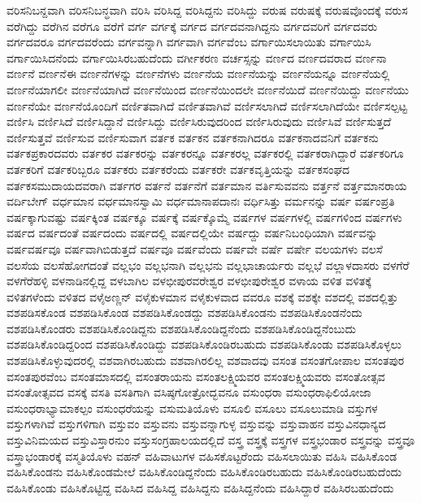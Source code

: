 {ವರಿಸನಿಬನ್ದವಾಗಿ
ವರಿಸನಿಬನ್ಧವಾಗಿ
ವರಿಸಿ
ವರಿಸಿದ್ದ
ವರಿಸಿದ್ದನು
ವರಿಸಿದ್ದು
ವರುಷ
ವರುಷಕ್ಕೆ
ವರುಷವೊಂದಕ್ಕೆ
ವರುಸ
ವರೆಗಿದ್ದು
ವರೆಗಿನ
ವರೆಗೂ
ವರೆಗೆ
ವರ್ಗ
ವರ್ಗಕ್ಕೆ
ವರ್ಗದ
ವರ್ಗದವನಾಗಿದ್ದನು
ವರ್ಗದವರಿಗೆ
ವರ್ಗದವರು
ವರ್ಗದವರೂ
ವರ್ಗದವರೆಂದು
ವರ್ಗವನ್ನಾಗಿ
ವರ್ಗವಾಗಿ
ವರ್ಗವೆಂಬ
ವರ್ಗಾಯಿಸಲಾಯಿತು
ವರ್ಗಾಯಿಸಿ
ವರ್ಗಾಯಿಸಿದನೆಂದು
ವರ್ಗಾಯಿಸಿರಬಹುದೆಂದು
ವರ್ಗೀಕರಣ
ವರ್ಚಸ್ಸನ್ನು
ವರ್ಣದ
ವರ್ಣದವರಾದ
ವರ್ಣನಾ
ವರ್ಣನೆ
ವರ್ಣನೆಈ
ವರ್ಣನೆಗಳನ್ನು
ವರ್ಣನೆಗಳು
ವರ್ಣನೆಯ
ವರ್ಣನೆಯನ್ನು
ವರ್ಣನೆಯನ್ನೂ
ವರ್ಣನೆಯಲ್ಲಿ
ವರ್ಣನೆಯಾಗಲೀ
ವರ್ಣನೆಯಾಗಿದೆ
ವರ್ಣನೆಯಿಂದ
ವರ್ಣನೆಯಿಂದಲೇ
ವರ್ಣನೆಯಿದೆ
ವರ್ಣನೆಯಿದ್ದು
ವರ್ಣನೆಯು
ವರ್ಣನೆಯೇ
ವರ್ಣನೆಯೊಂದಿಗೆ
ವರ್ಣಿತವಾಗಿದೆ
ವರ್ಣಿತವಾಗಿವೆ
ವರ್ಣಿಸಲಾಗಿದೆ
ವರ್ಣಿಸಲಾಗಿದೆಯೇ
ವರ್ಣಿಸಲ್ಪಟ್ಟ
ವರ್ಣಿಸಿ
ವರ್ಣಿಸಿದೆ
ವರ್ಣಿಸಿದ್ದಾನೆ
ವರ್ಣಿಸಿದ್ದು
ವರ್ಣಿಸಿರುವುದರಿಂದ
ವರ್ಣಿಸಿರುವುದು
ವರ್ಣಿಸಿವೆ
ವರ್ಣಿಸುತ್ತದೆ
ವರ್ಣಿಸುತ್ತವೆ
ವರ್ಣಿಸುವ
ವರ್ಣಿಸುವಾಗ
ವರ್ತಕ
ವರ್ತಕನ
ವರ್ತಕನಾಗಿದರೂ
ವರ್ತಕನಾದವನಿಗೆ
ವರ್ತಕನು
ವರ್ತಕಪ್ರಕಾರದವರು
ವರ್ತಕರ
ವರ್ತಕರನ್ನು
ವರ್ತಕರನ್ನೂ
ವರ್ತಕರಲ್ಲ
ವರ್ತಕರಲ್ಲಿ
ವರ್ತಕರಾಗಿದ್ದಾರೆ
ವರ್ತಕರಿಗೂ
ವರ್ತಕರಿಗೆ
ವರ್ತಕರಿಬ್ಬರೂ
ವರ್ತಕರು
ವರ್ತಕರೆಂದು
ವರ್ತಕರೇ
ವರ್ತಕವೃತ್ತಿಯನ್ನು
ವರ್ತಕಸಂಘದ
ವರ್ತಕಸಮುದಾಯದವರಾಗಿ
ವರ್ತಗರ
ವರ್ತನೆ
ವರ್ತನೆಗೆ
ವರ್ತಮಾನ
ವರ್ತಿಸುವವನು
ವರ್ತ್ತನೆ
ವರ್ತ್ತಮಾನರಾಯ
ವರ್ದಿಬೇಗ್
ವರ್ಧಮಾನ
ವರ್ಧಮಾನಸ್ವಾಮಿ
ವರ್ಧಮಾನಾಪದಾನಃ
ವರ್ಧಿಸಿತ್ತು
ವರ್ಮನನ್ನು
ವರ್ಷ
ವರ್ಷಂಪ್ರತಿ
ವರ್ಷಕ್ಕಾಗುವಷ್ಟು
ವರ್ಷಕ್ಕಿಂತ
ವರ್ಷಕ್ಕೂ
ವರ್ಷಕ್ಕೆ
ವರ್ಷಕ್ಕೊಮ್ಮೆ
ವರ್ಷಗಳ
ವರ್ಷಗಳಲ್ಲಿ
ವರ್ಷಗಳಿಂದ
ವರ್ಷಗಳು
ವರ್ಷದ
ವರ್ಷದಂತೆ
ವರ್ಷದಂದು
ವರ್ಷದಲ್ಲಿ
ವರ್ಷದಲ್ಲಿಯೇ
ವರ್ಷದ್ದು
ವರ್ಷನಿಬಂಧಿಯಾಗಿ
ವರ್ಷವನ್ನು
ವರ್ಷವರ್ಷವೂ
ವರ್ಷವಾಗಿಬಿಡುತ್ತದೆ
ವರ್ಷವೂ
ವರ್ಷವೆಂದು
ವರ್ಷವೇ
ವರ್ಷೆ
ವರ್ಷೇ
ವಲಯಗಳು
ವಲಸೆ
ವಲಸೆಯ
ವಲಸೆಹೋಗದಂತೆ
ವಲ್ಲಭಂ
ವಲ್ಲಭನಾಗಿ
ವಲ್ಲಭನು
ವಲ್ಲಭಾಚಾರ್ಯರು
ವಲ್ಲಭೆ
ವಲ್ಲಾಳದಾಸರು
ವಳಗೆರೆ
ವಳಗೆರೆಹಳ್ಳಿ
ವಳನಾಡಿನಲ್ಲಿದ್ದ
ವಳಬಾಗಿಲ
ವಳಭೀಪುರವರೇಶ್ವರ
ವಳಭೀಪುರೇಶ್ವರ
ವಳಾಯ
ವಳಿತ
ವಳಿತಕ್ಕೆ
ವಳಿತಗಳೆಂದು
ವಳಿತದ
ವಳೈಅಣ್ಣನ್
ವಳೈಕುಳಮಾನ
ವಳೈಕುಳವಾದ
ವವರೂ
ವಶಕ್ಕೆ
ವಶಕ್ಕೇ
ವಶದಲ್ಲಿ
ವಶದಲ್ಲಿತ್ತು
ವಶಪಡಿಸಕೊಂಡ
ವಶಪಡಿಸಿಕೊಂಡ
ವಶಪಡಿಸಿಕೊಂಡದ್ದು
ವಶಪಡಿಸಿಕೊಂಡನು
ವಶಪಡಿಸಿಕೊಂಡನೆಂದು
ವಶಪಡಿಸಿಕೊಂಡರು
ವಶಪಡಿಸಿಕೊಂಡಿದ್ದನು
ವಶಪಡಿಸಿಕೊಂಡಿದ್ದನೆಂದು
ವಶಪಡಿಸಿಕೊಂಡಿದ್ದನೆಂಬುದು
ವಶಪಡಿಸಿಕೊಂಡಿದ್ದರಿಂದ
ವಶಪಡಿಸಿಕೊಂಡಿದ್ದು
ವಶಪಡಿಸಿಕೊಂಡಿರಬಹುದು
ವಶಪಡಿಸಿಕೊಂಡು
ವಶಪಡಿಸಿಕೊಳ್ಳಲು
ವಶಪಡಿಸಿಕೊಳ್ಳುವುದರಲ್ಲಿ
ವಶವಾಗಿರಬಹುದು
ವಶವಾಗಿರಲಿಲ್ಲ
ವಶವಾದವು
ವಸಂತ
ವಸಂತಗೋಪಾಲ
ವಸಂತಪುರ
ವಸಂತಪುರವೆಂಬ
ವಸಂತಮಾಸದಲ್ಲಿ
ವಸಂತರಾಯನು
ವಸಂತಲಕ್ಷ್ಮಿಯವರ
ವಸಂತಲಕ್ಷ್ಮಿಯವರು
ವಸಂತೋತ್ಸವ
ವಸಂತೋತ್ಸವದ
ವಸಕ್ಕೆ
ವಸತಿ
ವಸತಿಗಾಗಿ
ವಸಿಷ್ಠಗೋತ್ರೋದ್ಭವನೂ
ವಸುಂಧರಾ
ವಸುಂಧರಾಫಿಲಿಯೋಜಾ
ವಸುಂಧರಾಭ್ಯಾಮಾಕಲ್ಪಂ
ವಸುಂಧರೆಯನ್ನು
ವಸುಮತಿಯೊಳು
ವಸೂಲಿ
ವಸೂಲು
ವಸೂಲುಮಾಡಿ
ವಸ್ತುಗಳ
ವಸ್ತುಗಳಾಗಿವೆ
ವಸ್ತುಗಳಿಗಾಗಿ
ವಸ್ತುವಂ
ವಸ್ತುವನು
ವಸ್ತುವನ್ನಾಗುಳ್ಳ
ವಸ್ತುವನ್ನು
ವಸ್ತುವಾಹನ
ವಸ್ತುವಿನಧಾನ್ಯದ
ವಸ್ತುವಿನಿಮಯದ
ವಸ್ತುವಿಸ್ತಾರನುಂ
ವಸ್ತುಸಂಗ್ರಹಾಲಯದಲ್ಲಿದೆ
ವಸ್ತ್ರ
ವಸ್ತ್ರಕ್ಕೆ
ವಸ್ತ್ರಗಳ
ವಸ್ತ್ರಭಂಡಾರ
ವಸ್ತ್ರವನ್ನು
ವಸ್ತ್ರವೂ
ವಸ್ತ್ರಾಭಂಡಾರಕ್ಕೆ
ವಸ್ಮತಿಯೊಳು
ವಹನ್
ವಹಿವಾಟುಗಳ
ವಹಿಸಕೊಟ್ಟರೆಂದು
ವಹಿಸಲಾಯಿತು
ವಹಿಸಿ
ವಹಿಸಿಕೊಂಡ
ವಹಿಸಿಕೊಂಡನು
ವಹಿಸಿಕೊಂಡಮೇಲೆ
ವಹಿಸಿಕೊಂಡಿದ್ದನೆಂದು
ವಹಿಸಿಕೊಂಡಿರಬಹುದು
ವಹಿಸಿಕೊಂಡಿರಬಹುದೆಂದು
ವಹಿಸಿಕೊಂಡು
ವಹಿಸಿಕೊಟ್ಟಿದ್ದ
ವಹಿಸಿದ
ವಹಿಸಿದ್ದ
ವಹಿಸಿದ್ದನು
ವಹಿಸಿದ್ದನೆಂದು
ವಹಿಸಿದ್ದಾರೆ
ವಹಿಸಿರಬಹುದೆಂದು
}

